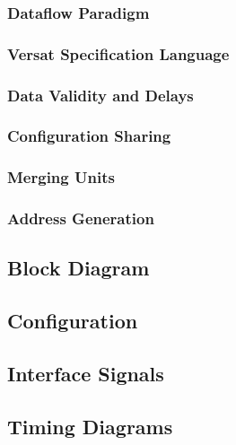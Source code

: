 \documentclass{ug}
\begin{document}
\subsubsection{Dataflow Paradigm}
\label{sec:dataflow}


\subsubsection{Versat Specification Language}
\label{sec:versat_spec}


\subsubsection{Data Validity and Delays}
\label{sec:data_validity}


\subsubsection{Configuration Sharing}
\label{sec:config_sharing}


\subsubsection{Merging Units}
\label{sec:merging_units}


\subsubsection{Address Generation}
\label{sec:address_gen}


\subsection{Block Diagram}
\label{sec:bdd}


\ifdefined\CONFS
\subsection{Configuration}
\label{sec:ipconfig}

\fi

\subsection{Interface Signals}
\label{sec:ifsig}


\ifdefined\TD
\subsection{Timing Diagrams}
\label{sec:td}

\fi
\end{document}
